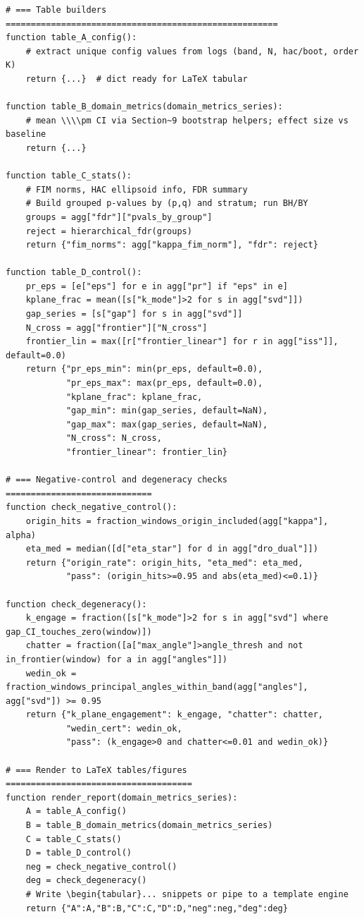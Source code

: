 \begin{lstlisting}
# === Table builders ======================================================
function table_A_config():
    # extract unique config values from logs (band, N, hac/boot, order K)
    return {...}  # dict ready for LaTeX tabular

function table_B_domain_metrics(domain_metrics_series):
    # mean \\\\pm CI via Section~9 bootstrap helpers; effect size vs baseline
    return {...}

function table_C_stats():
    # FIM norms, HAC ellipsoid info, FDR summary
    # Build grouped p-values by (p,q) and stratum; run BH/BY
    groups = agg["fdr"]["pvals_by_group"]
    reject = hierarchical_fdr(groups)
    return {"fim_norms": agg["kappa_fim_norm"], "fdr": reject}

function table_D_control():
    pr_eps = [e["eps"] for e in agg["pr"] if "eps" in e]
    kplane_frac = mean([s["k_mode"]>2 for s in agg["svd"]])
    gap_series = [s["gap"] for s in agg["svd"]]
    N_cross = agg["frontier"]["N_cross"]
    frontier_lin = max([r["frontier_linear"] for r in agg["iss"]], default=0.0)
    return {"pr_eps_min": min(pr_eps, default=0.0),
            "pr_eps_max": max(pr_eps, default=0.0),
            "kplane_frac": kplane_frac,
            "gap_min": min(gap_series, default=NaN),
            "gap_max": max(gap_series, default=NaN),
            "N_cross": N_cross,
            "frontier_linear": frontier_lin}

# === Negative-control and degeneracy checks =============================
function check_negative_control():
    origin_hits = fraction_windows_origin_included(agg["kappa"], alpha)
    eta_med = median([d["eta_star"] for d in agg["dro_dual"]])
    return {"origin_rate": origin_hits, "eta_med": eta_med,
            "pass": (origin_hits>=0.95 and abs(eta_med)<=0.1)}

function check_degeneracy():
    k_engage = fraction([s["k_mode"]>2 for s in agg["svd"] where gap_CI_touches_zero(window)])
    chatter = fraction([a["max_angle"]>angle_thresh and not in_frontier(window) for a in agg["angles"]])
    wedin_ok = fraction_windows_principal_angles_within_band(agg["angles"], agg["svd"]) >= 0.95
    return {"k_plane_engagement": k_engage, "chatter": chatter,
            "wedin_cert": wedin_ok,
            "pass": (k_engage>0 and chatter<=0.01 and wedin_ok)}

# === Render to LaTeX tables/figures =====================================
function render_report(domain_metrics_series):
    A = table_A_config()
    B = table_B_domain_metrics(domain_metrics_series)
    C = table_C_stats()
    D = table_D_control()
    neg = check_negative_control()
    deg = check_degeneracy()
    # Write \begin{tabular}... snippets or pipe to a template engine
    return {"A":A,"B":B,"C":C,"D":D,"neg":neg,"deg":deg}

\end{lstlisting}

